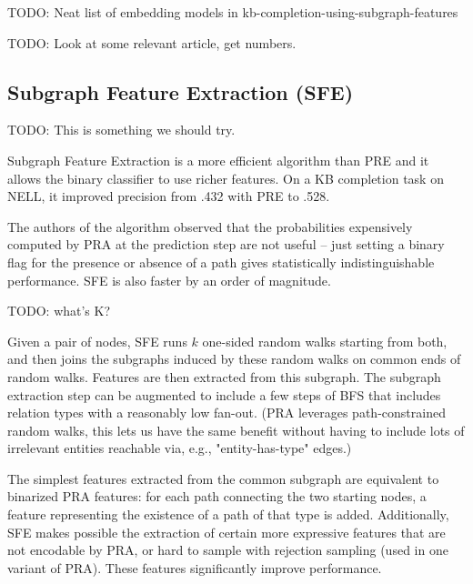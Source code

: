 TODO: Neat list of embedding models in kb-completion-using-subgraph-features

TODO: Look at some relevant article, get numbers.

\subsection{Subgraph Feature Extraction (SFE)}

TODO: This is something we should try.

Subgraph Feature Extraction\cite{subgraph-feature-extraction} is a more
efficient algorithm than PRE and it allows the binary classifier to use richer
features. On a KB completion task on NELL, it improved precision from .432 with
PRE to .528.


The authors of the algorithm observed that the probabilities expensively
computed by PRA at the prediction step are not
useful\cite{subgraph-feature-extraction} -- just setting a binary flag for the
presence or absence of a path gives statistically indistinguishable performance.
SFE is also faster by an order of magnitude.

TODO: what's K?

Given a pair of nodes, SFE runs $k$ one-sided random walks starting from both,
and then joins the subgraphs induced by these random walks on common ends of
random walks. Features are then extracted from this subgraph.
The subgraph extraction step can be augmented to include a few steps of BFS
that includes relation types with a reasonably low fan-out.
(PRA leverages path-constrained random walks, this lets us have the same
benefit without having to include lots of irrelevant entities reachable via,
e.g., "entity-has-type" edges.)

The simplest features extracted from the common subgraph are equivalent to
binarized PRA features: for each path connecting the two starting nodes, a
feature representing the existence of a path of that type is added.
Additionally, SFE makes possible the extraction of certain more expressive
features that are not encodable by PRA, or hard to sample with rejection
sampling (used in one variant of PRA). These features significantly improve
performance.

